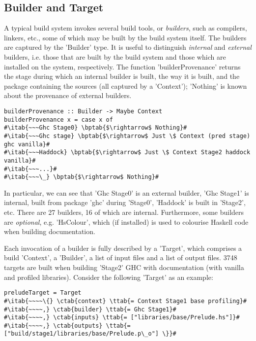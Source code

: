 \subsection{\textsf{Builder} and \textsf{Target}\label{sec:general-abstractions}}

A typical build system invokes several build tools, or \emph{builders}, such as
compilers, linkers, etc., some of which may be built by the
build system itself. The builders are captured by the \lst'Builder' type. It
is useful to distinguish \emph{internal} and \emph{external} builders, i.e.
those that are built by the build system and those which are installed on the
system, respectively. The function \lst'builderProvenance' returns the stage
during which an internal builder is built, the way it is built, and the package
containing the sources (all captured by a \lst'Context'); \lst'Nothing' is
known about the provenance of external builders.

\newcommand{\bptab}[1]{\hspace{.108\textwidth}\rlap{#1}}

\begin{lstlisting}
builderProvenance :: Builder -> Maybe Context
builderProvenance x = case x of
#\itab{~~~Ghc Stage0} \bptab{$\rightarrow$ Nothing}#
#\itab{~~~Ghc stage} \bptab{$\rightarrow$ Just \$ Context (pred stage) ghc vanilla}#
#\itab{~~~Haddock} \bptab{$\rightarrow$ Just \$ Context Stage2 haddock vanilla}#
#\itab{~~~...}#
#\itab{~~~\_} \bptab{$\rightarrow$ Nothing}#
\end{lstlisting}

\noindent In particular, we can see that \lst'Ghc Stage0' is an external
builder, \lst'Ghc Stage1' is internal, built from package \lst'ghc'
during \lst'Stage0', \lst'Haddock' is built in \lst'Stage2', etc. There are
27 builders, 16 of which are internal. Furthermore, some builders are
\emph{optional}, e.g. \lst'HsColour', which (if installed) is used to
colourise Haskell code when building documentation.

Each invocation of a builder is fully described by a \lst'Target', which
comprises a build \lst'Context', a \lst'Builder', a list of input files and
a list of output files. 3748 targets are built when building \lst'Stage2' GHC
with documentation (with vanilla and profiled libraries). Consider the following
\lst'Target' as an example:

\begin{lstlisting}
preludeTarget = Target
#\itab{~~~~\{} \ctab{context} \ttab{= Context Stage1 base profiling}#
#\itab{~~~~,} \ctab{builder} \ttab{= Ghc Stage1}#
#\itab{~~~~,} \ctab{inputs} \ttab{= ["libraries/base/Prelude.hs"]}#
#\itab{~~~~,} \ctab{outputs} \ttab{= ["build/stage1/libraries/base/Prelude.p\_o"] \}}#
\end{lstlisting}

